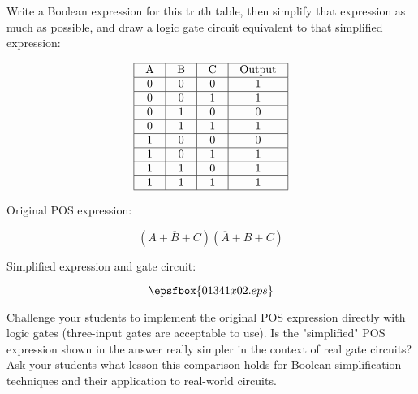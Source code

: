 

Write a Boolean expression for this truth table, then simplify that expression as much as possible, and draw a logic gate circuit equivalent to that simplified expression:



$$\vbox{\offinterlineskip
\halign{\strut
\vrule \quad\hfil # \ \hfil & 
\vrule \quad\hfil # \ \hfil & 
\vrule \quad\hfil # \ \hfil & 
\vrule \quad\hfil # \ \hfil \vrule \cr
\noalign{\hrule}
%
A & B & C & Output \cr
%
\noalign{\hrule}
%
0 & 0 & 0 & 1 \cr
%
\noalign{\hrule}
%
0 & 0 & 1 & 1 \cr
%
\noalign{\hrule}
%
0 & 1 & 0 & 0 \cr
%
\noalign{\hrule}
%
0 & 1 & 1 & 1 \cr
%
\noalign{\hrule}
%
1 & 0 & 0 & 0 \cr
%
\noalign{\hrule}
%
1 & 0 & 1 & 1 \cr
%
\noalign{\hrule}
%
1 & 1 & 0 & 1 \cr
%
\noalign{\hrule}
%
1 & 1 & 1 & 1 \cr
%
\noalign{\hrule}
} %
}$$ %







Original POS expression:

$$(A + \overline{B} + C)(\overline{A} + B + C)$$

Simplified expression and gate circuit:

$$\epsfbox{01341x02.eps}$$







Challenge your students to implement the original POS expression directly with logic gates (three-input gates are acceptable to use).  Is the "simplified" POS expression shown in the answer really simpler in the context of real gate circuits?  Ask your students what lesson this comparison holds for Boolean simplification techniques and their application to real-world circuits.




